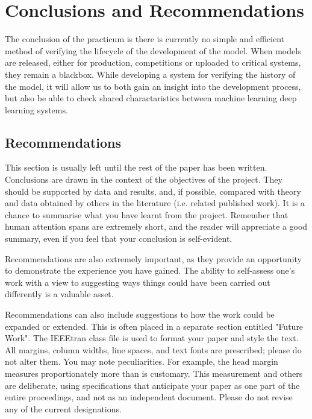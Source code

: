 \section{Conclusions and Recommendations}

The conclusion of the practicum is there is currently no simple and efficient  method of verifying the lifecycle of the development of the model. When models are released, either for production, competitions or uploaded to critical systems, they remain a blackbox. While developing a system for verifying the history of the model, it will allow us to both gain an insight into the development process, but also be able to check shared charactaristics between machine learning deep learning systems.


\subsection{Recommendations}

This section is usually left until the rest of the paper has been written. Conclusions are drawn in the context of the objectives of the project. They should be supported by data and results, and, if possible, compared with theory and data obtained by others in the literature (i.e. related published work). It is a chance to summarise what you have learnt from the project. Remember that human attention spans are extremely short, and the reader will appreciate a good summary, even if you feel that your conclusion is self-evident.

Recommendations are also extremely important, as they provide an opportunity to demonstrate the experience you have gained. The ability to self-assess one's work with a view to suggesting ways things could have been carried out differently is a valuable asset.

Recommendations can also include suggestions to how the work could be expanded or extended. This is often placed in a separate section entitled "Future Work".
The IEEEtran class file is used to format your paper and style the text. All margins, 
column widths, line spaces, and text fonts are prescribed; please do not 
alter them. You may note peculiarities. For example, the head margin
measures proportionately more than is customary. This measurement 
and others are deliberate, using specifications that anticipate your paper 
as one part of the entire proceedings, and not as an independent document. 
Please do not revise any of the current designations.


